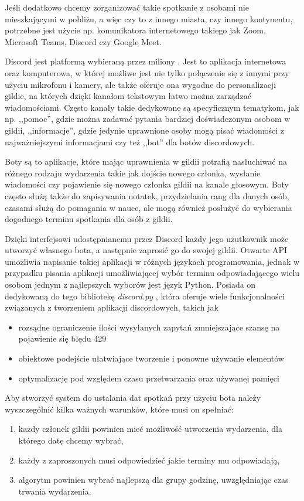 \documentclass[11pt,a4paper]{article}
\begin{document}
Jeśli dodatkowo chcemy zorganizować takie spotkanie z osobami nie mieszkającymi w pobliżu, a więc czy to z innego miasta, czy innego kontynentu, potrzebne jest użycie np. komunikatora internetowego takiego jak Zoom, Microsoft Teams, Discord czy Google Meet.

Discord jest platformą wybieraną przez miliony \cite{DiscordPopularity}. Jest to aplikacja internetowa oraz komputerowa, w której możliwe jest nie tylko połączenie się z innymi przy użyciu mikrofonu i kamery, ale także oferuje ona wygodne do personalizacji gildie, na których dzięki kanałom tekstowym łatwo można zarządzać wiadomościami. Często kanały takie dedykowane są specyficznym tematykom,  jak np. ,,pomoc'', gdzie można zadawać pytania bardziej doświadczonym osobom w gildii, ,,informacje'', gdzie jedynie uprawnione osoby mogą pisać wiadomości z najważniejszymi informacjami czy też ,,bot'' dla botów discordowych. 

Boty są to aplikacje, które mając uprawnienia w gildii potrafią nasłuchiwać na różnego rodzaju wydarzenia takie jak dojście nowego członka, wysłanie wiadomości czy pojawienie się nowego członka gildii na kanale głosowym. Boty często służą także do zapisywania notatek, przydzielania rang dla danych osób, czasami służą do pomagania w nauce, ale mogą również posłużyć do wybierania dogodnego terminu spotkania dla osób z gildii. 

Dzięki interfejsowi udostępnianemu przez Discord każdy jego użutkownik może  utworzyć własnego bota, a następnie zaprosić go do swojej gildii.
Otwarte API umożliwia napisanie takiej aplikacji w różnych językach programowania, jednak w przypadku pisania aplikacji umożliwiającej wybór terminu odpowiadającego wielu osobom jednym z najlepszych wyborów jest język Python. Posiada on dedykowaną do tego bibliotekę \textit{discord.py} \cite{DiscordPy}, która oferuje wiele funkcjonalności związanych z tworzeniem aplikacji discordowych, takich jak 
\begin{itemize}
    \item rozsądne ograniczenie ilości wysyłanych zapytań zmniejszające szansę na pojawienie się błędu 429
    \item obiektowe podejście ułatwiające tworzenie i ponowne używanie elementów
    \item optymalizację pod względem czasu przetwarzania oraz używanej pamięci
\end{itemize}

Aby stworzyć system do ustalania dat spotkań przy użyciu bota należy wyszczególnić kilka ważnych warunków, które musi on spełniać:
\begin{enumerate}
    \item każdy członek gildii powinien mieć możliwość utworzenia wydarzenia, dla którego datę chcemy wybrać,
    \item każdy z zaproszonych musi odpowiedzieć jakie terminy mu odpowiadają,
    \item algorytm powinien wybrać najlepszą dla grupy godzinę, uwzględniając czas trwania wydarzenia.
\end{enumerate}
\end{document}
